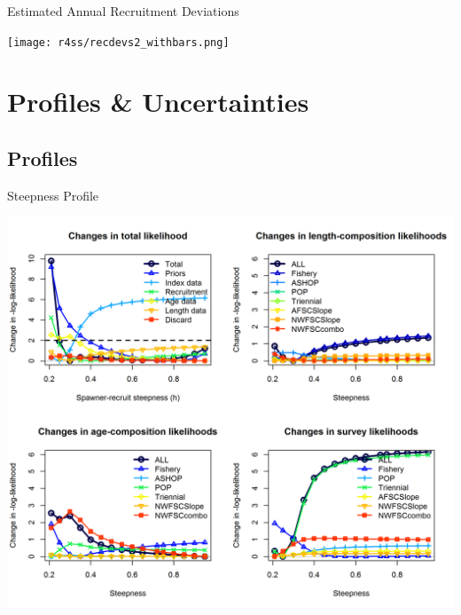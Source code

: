 \documentclass[pdf]{beamer}\usepackage[]{graphicx}\usepackage[]{color}
\begin{document}
\begin{frame}{Estimated Annual Recruitment Deviations}
  \begin{center}
    \texttt{[image: r4ss/recdevs2\_withbars.png]}
  \end{center}
\end{frame}

\section{Profiles \& Uncertainties}
\subsection{Profiles}
\begin{frame}{Steepness Profile}
  \begin{center}
    \includegraphics[scale = 0.40]{figures/piner_panel_h.png}
  \end{center}
\end{frame}
\end{document}
